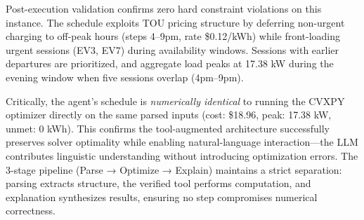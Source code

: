 \documentclass[11pt]{article}
\begin{document}
Post-execution validation confirms zero hard constraint violations on this instance. The schedule exploits TOU pricing structure by deferring non-urgent charging to off-peak hours (steps 4--9pm, rate \$0.12/kWh) while front-loading urgent sessions (EV3, EV7) during availability windows. Sessions with earlier departures are prioritized, and aggregate load peaks at 17.38 kW during the evening window when five sessions overlap (4pm--9pm).

Critically, the agent's schedule is \textit{numerically identical} to running the CVXPY optimizer directly on the same parsed inputs (cost: \$18.96, peak: 17.38 kW, unmet: 0 kWh). This confirms the tool-augmented architecture successfully preserves solver optimality while enabling natural-language interaction—the LLM contributes linguistic understanding without introducing optimization errors. The 3-stage pipeline (Parse → Optimize → Explain) maintains a strict separation: parsing extracts structure, the verified tool performs computation, and explanation synthesizes results, ensuring no step compromises numerical correctness.
\end{document}
